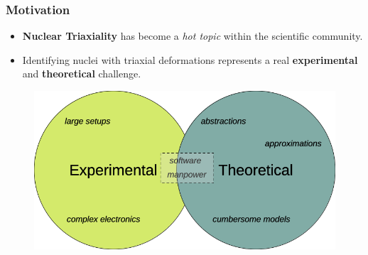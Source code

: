 \documentclass{beamer}
\begin{document}
\begin{frame}
	\frametitle{Motivation}
    \vspace{-0.3cm}
    \begin{itemize}
        \item \textbf{Nuclear Triaxiality} has become a \emph{hot topic} within the scientific community.
        \item Identifying nuclei with triaxial deformations represents a real \textbf{experimental} and \textbf{theoretical} challenge.
    \end{itemize}
    \vspace{-0.2cm}
    \begin{figure}
        \centering
        \includegraphics[scale=0.35]{figures/exp_vs_theory.png}
    \end{figure}
\end{frame}
\end{document}

